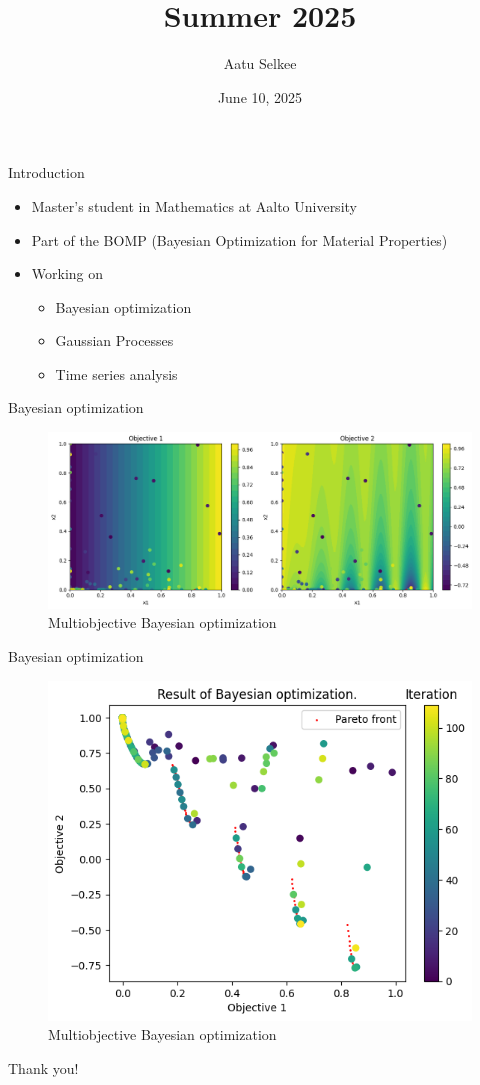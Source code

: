 \documentclass{beamer}
\title{Summer 2025}
\author{Aatu Selkee}
\date{June 10, 2025}
\begin{document}
\frame{\titlepage}

\begin{frame}{Introduction}
    \begin{itemize}
        \item<1-> Master's student in Mathematics at Aalto University
        \item<2-> Part of the BOMP (Bayesian Optimization for Material Properties)
        \item<3-> Working on \begin{itemize}
            \item Bayesian optimization
            \item Gaussian Processes
            \item Time series analysis
        \end{itemize}
    \end{itemize}
\end{frame}

\begin{frame}{Bayesian optimization}
    \begin{figure}
        \centering
        \includegraphics[width=1.0\linewidth]{../Images//DeepKernelLearning/DKL_result_X.png}
        \caption{Multiobjective Bayesian optimization}
        \label{fig:mobo}
    \end{figure}
\end{frame}

\begin{frame}{Bayesian optimization}
    \begin{figure}
        \centering
        \includegraphics[width=0.8\linewidth]{../Images//DeepKernelLearning/DKL_result_Y.png}
        \caption{Multiobjective Bayesian optimization}
        \label{fig:mobo}
    \end{figure}
\end{frame}

\begin{frame}
    \begin{center}
        \Huge{Thank you!}
    \end{center}
\end{frame}
\end{document}
